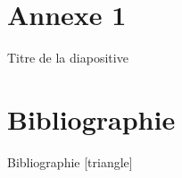 \documentclass[8pt,aspectratio=169,xcolor=dvipsnames, compress]{beamer}
\begin{document}
  \section{Annexe 1}
\begin{frame}{Titre de la diapositive}
  
\end{frame}

  \section{Bibliographie}

  \begin{frame}[allowframebreaks, t]{Bibliographie}
    [triangle]
    \printbibliography[heading=none]
  \end{frame}
\end{document}
